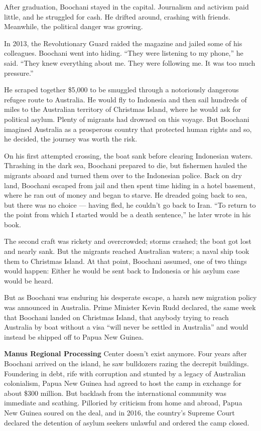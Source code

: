 After graduation, Boochani stayed in the capital. Journalism and
activism paid little, and he struggled for cash. He drifted around,
crashing with friends. Meanwhile, the political danger was growing.

In 2013, the Revolutionary Guard raided the magazine and jailed some of
his colleagues. Boochani went into hiding. ``They were listening to my
phone,'' he said. ``They knew everything about me. They were following
me. It was too much pressure.''

He scraped together \$5,000 to be smuggled through a notoriously
dangerous refugee route to Australia. He would fly to Indonesia and then
sail hundreds of miles to the Australian territory of Christmas Island,
where he would ask for political asylum. Plenty of migrants had drowned
on this voyage. But Boochani imagined Australia as a prosperous country
that protected human rights and so, he decided, the journey was worth
the risk.

On his first attempted crossing, the boat sank before clearing
Indonesian waters. Thrashing in the dark sea, Boochani prepared to die,
but fishermen hauled the migrants aboard and turned them over to the
Indonesian police. Back on dry land, Boochani escaped from jail and then
spent time hiding in a hotel basement, where he ran out of money and
began to starve. He dreaded going back to sea, but there was no choice
--- having fled, he couldn't go back to Iran. ``To return to the point
from which I started would be a death sentence,'' he later wrote in his
book.

The second craft was rickety and overcrowded; storms crashed; the boat
got lost and nearly sank. But the migrants reached Australian waters; a
naval ship took them to Christmas Island. At that point, Boochani
assumed, one of two things would happen: Either he would be sent back to
Indonesia or his asylum case would be heard.

But as Boochani was enduring his desperate escape, a harsh new migration
policy was announced in Australia. Prime Minister Kevin Rudd declared,
the same week that Boochani landed on Christmas Island, that anybody
trying to reach Australia by boat without a visa ``will never be settled
in Australia'' and would instead be shipped off to Papua New Guinea.

\textbf{Manus Regional Processing} Center doesn't exist anymore. Four
years after Boochani arrived on the island, he saw bulldozers razing the
decrepit buildings. Foundering in debt, rife with corruption and stunted
by a legacy of Australian colonialism, Papua New Guinea had agreed to
host the camp in exchange for about \$300 million. But backlash from the
international community was immediate and scathing. Pilloried by
criticism from home and abroad, Papua New Guinea soured on the deal, and
in 2016, the country's Supreme Court declared the detention of asylum
seekers unlawful and ordered the camp closed.

